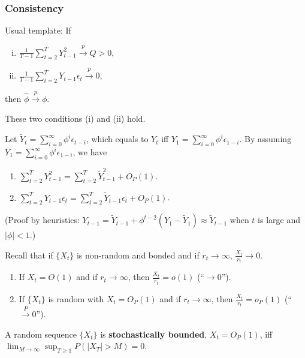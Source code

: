 \documentclass[11pt]{elegantbook}
\begin{document}
\subsubsection*{Consistency}
Usual template: If
\begin{enumerate}[(i).]
    \item $\frac{1}{T-1}\sum_{t=2}^T Y_{t-1}^2 \stackrel{p}{\longrightarrow} Q>0$,
    \item $\frac{1}{T-1}\sum_{t=2}^T Y_{t-1}\epsilon_t \stackrel{p}{\longrightarrow} 0$,
\end{enumerate}
then $\hat{\phi}\stackrel{p}{\longrightarrow} \phi$.
\begin{claim}
    These two conditions (i) and (ii) hold.
\end{claim}
Let $\tilde{Y}_t=\sum_{i=0}^\infty \phi^i\epsilon_{t-i}$, which equals to $Y_t$ iff $Y_1=\sum_{i=0}^\infty \phi^i\epsilon_{1-i}$. By assuming $Y_1=\sum_{i=0}^\infty \phi^i\epsilon_{1-i}$, we have
\begin{enumerate}
    \item $\sum_{t=2}^T Y_{t-1}^2=\sum_{t=2}^T \tilde{Y}_{t-1}^2+ O_P(1)$.
    \item $\sum_{t=2}^T Y_{t-1}\epsilon_t=\sum_{t=2}^T \tilde{Y}_{t-1}\epsilon_t+ O_P(1)$.
\end{enumerate}
(Proof by heuristics: $Y_{t-1}=\tilde{Y}_{t-1}+\phi^{t-2}(Y_1-\tilde{Y}_1)\approx \tilde{Y}_{t-1}$ when $t$ is large and $|\phi|<1$.)

Recall that if $\{X_t\}$ is non-random and bonded and if $r_t \rightarrow \infty$, $\frac{X_t}{r_t} \rightarrow 0$.
\begin{enumerate}
    \item If $X_t=O(1)$ and if $r_t \rightarrow \infty$, then $\frac{X_t}{r_t}=o(1)$ (``$\rightarrow 0$'').
    \item If $\{X_t\}$ is random with $X_t=O_P(1)$ and if $r_t \rightarrow \infty$, then $\frac{X_t}{r_t}=o_P(1)$ (``$\stackrel{P}{\longrightarrow} 0$'').
\end{enumerate}

\begin{definition}
    A random sequence $\{X_t\}$ is \textbf{stochastically bounded}, $X_t=O_P(1)$, iff $\lim_{M \rightarrow \infty}\sup_{T\geq 1}P(|X_T|>M)=0$.
\end{definition}
\end{document}
